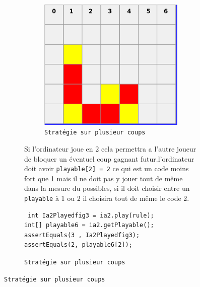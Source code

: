 \begin{figure}[H]
\begin{figure}[H]
\begin{figure}[H]
\begin{center}
  \includegraphics[scale=0.2]{playable2}
  \caption{\texttt{Stratégie sur plusieur coups}}
\end{center}
\end{figure}

Si l'ordinateur joue en 2 cela permettra a l'autre joueur de bloquer 
un éventuel coup gagnant futur.l'ordinateur doit avoir \texttt{playable[2] = 2} ce qui est
 un code moins fort que 1 mais il ne doit pas y jouer tout de même dans la mesure du possibles, si
il doit choisir entre un \texttt{playable} à 1 ou 2 il choisira tout de même le code 2.

\begin{verbatim}
 int Ia2Playedfig3 = ia2.play(rule);
int[] playable6 = ia2.getPlayable();
assertEquals(3 , Ia2Playedfig3);
assertEquals(2, playable6[2]);
\end{verbatim}





\end{figure}
\end{figure}
